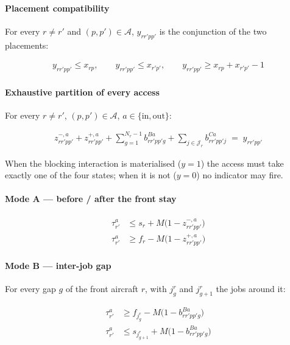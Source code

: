 \paragraph{Placement compatibility}

For every $r \ne r'$ and $(p,p') \in \mathcal{A}$, $y_{rr'pp'}$ is the
conjunction of the two placements:

\begin{align}
y_{rr'pp'} \le x_{rp}, \qquad
y_{rr'pp'} \le x_{r'p'}, \qquad
y_{rr'pp'} \ge x_{rp} + x_{r'p'} - 1
\end{align}

\paragraph{Exhaustive partition of every access}

For every $r \ne r'$, $(p,p') \in \mathcal{A}$,
$a \in \{\mathrm{in}, \mathrm{out}\}$:

\begin{align}
z^{-,a}_{rr'pp'} + z^{+,a}_{rr'pp'}
 + \sum_{g=1}^{N_r-1} b^{Ba}_{rr'pp'g}
 + \sum_{j \in \mathcal{J}_r} b^{Ca}_{rr'pp'j}
 \;=\; y_{rr'pp'}
\label{eq:doc-partition}
\end{align}

When the blocking interaction is materialised ($y = 1$) the access must
take exactly one of the four states; when it is not ($y = 0$) no
indicator may fire.

\paragraph{Mode A --- before / after the front stay}

\begin{align}
\tau^a_{r'} &\le s_r + M\bigl(1 - z^{-,a}_{rr'pp'}\bigr)
\label{eq:doc-zminus} \\
\tau^a_{r'} &\ge f_r - M\bigl(1 - z^{+,a}_{rr'pp'}\bigr)
\label{eq:doc-zplus}
\end{align}

\paragraph{Mode B --- inter-job gap}

For every gap $g$ of the front aircraft $r$, with $j^r_g$ and
$j^r_{g+1}$ the jobs around it:

\begin{align}
\tau^a_{r'} &\ge f_{j^r_g} - M\bigl(1 - b^{Ba}_{rr'pp'g}\bigr) \\
\tau^a_{r'} &\le s_{j^r_{g+1}} + M\bigl(1 - b^{Ba}_{rr'pp'g}\bigr)
\end{align}

